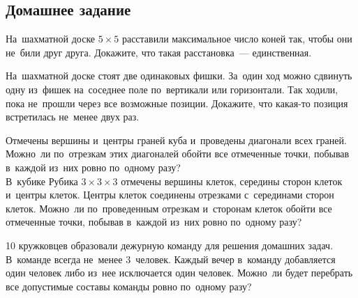 

\subsection*{Домашнее задание}



\begin{problems}

\item
На~шахматной доске $5 \times 5$ расставили максимальное число коней так, чтобы
они не~били друг друга.
Докажите, что такая расстановка~--- единственная.

\item
На~шахматной доске стоят две одинаковых фишки.
За~один ход можно сдвинуть одну из~фишек на~соседнее поле по~вертикали или
горизонтали.
Так ходили, пока не~прошли через все возможные позиции.
Докажите, что какая-то позиция встретилась не~менее двух раз.

\item
\sp
Отмечены вершины и~центры граней куба и~проведены диагонали всех граней.
Можно~ли по~отрезкам этих диагоналей обойти все отмеченные точки, побывав
в~каждой из~них ровно по~одному разу?
\\
\sp
В~кубике Рубика $3 \times 3 \times 3$ отмечены вершины клеток, середины сторон
клеток и~центры клеток.
Центры клеток соединены отрезками с~серединами сторон клеток.
Можно~ли по~проведенным отрезкам и~сторонам клеток обойти все отмеченные точки,
побывав в~каждой из~них ровно по~одному разу?

\item
10 кружковцев образовали дежурную команду для решения домашних задач.
В~команде всегда не~менее 3~человек.
Каждый вечер в~команду добавляется один человек либо из~нее исключается один
человек.
Можно~ли будет перебрать все допустимые составы команды ровно по~одному разу?

\end{problems}

